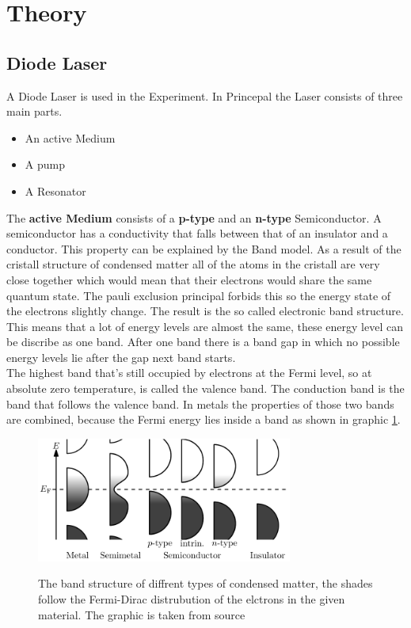 \section{Theory}
\label{sec:Theorie}

\subsection{Diode Laser}

A Diode Laser is used in the Experiment.
In Princepal the Laser consists of three main parts.
\begin{itemize}
    \item An active Medium
    \item A pump
    \item A Resonator
\end{itemize}

The \textbf{active Medium} consists of a \textbf{p-type} and an \textbf{n-type} Semiconductor.
A semiconductor has a conductivity that falls between that of an insulator and a conductor.
This property can be explained by the Band model. 
As a result of the cristall structure of condensed matter all of the atoms in the cristall are very close together which would mean that their electrons would share the same quantum state.
The pauli exclusion principal forbids this so the energy state of the electrons slightly change.
The result is the so called electronic band structure.
This means that a lot of energy levels are almost the same, these energy level can be discribe as one band.
After one band there is a band gap in which no possible energy levels lie after the gap next band starts.
\\
The highest band that's still occupied by electrons at the Fermi level, so at absolute zero temperature, is called the valence band.
The conduction band is the band that follows the valence band.
In metals the properties of those two bands are combined, because the Fermi energy lies inside a band as shown in graphic \ref{fig:band_structure}.

\begin{figure}
    \centering
    \caption{The band structure of diffrent types of condensed matter, the shades follow the Fermi-Dirac distrubution of the elctrons in the given material. The graphic is taken from source \cite{wikipedia_valence_conduction_band}}
    \includegraphics[width=0.75\textwidth]{content/data/Band_structure_diffrent_materials}
    \label{fig:band_structure}
\end{figure}

